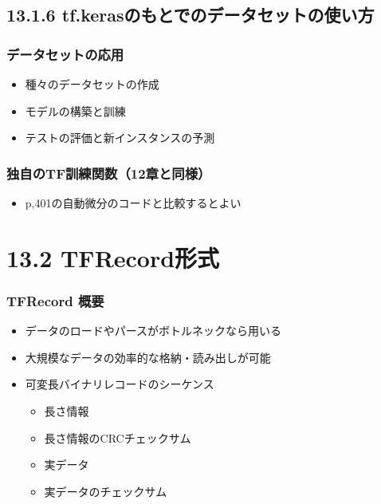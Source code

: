 \hypertarget{tf.kerasux306eux3082ux3068ux3067ux306eux30c7ux30fcux30bfux30bbux30c3ux30c8ux306eux4f7fux3044ux65b9}{%
\subsection{13.1.6
tf.kerasのもとでのデータセットの使い方}\label{tf.kerasux306eux3082ux3068ux3067ux306eux30c7ux30fcux30bfux30bbux30c3ux30c8ux306eux4f7fux3044ux65b9}}

\hypertarget{ux30c7ux30fcux30bfux30bbux30c3ux30c8ux306eux5fdcux7528}{%
\subsubsection{データセットの応用}\label{ux30c7ux30fcux30bfux30bbux30c3ux30c8ux306eux5fdcux7528}}

\begin{itemize}
\tightlist
\item
  種々のデータセットの作成
\item
  モデルの構築と訓練
\item
  テストの評価と新インスタンスの予測
\end{itemize}

\hypertarget{ux72ecux81eaux306etfux8a13ux7df4ux95a2ux657012ux7ae0ux3068ux540cux69d8}{%
\subsubsection{独自のTF訓練関数（12章と同様）}\label{ux72ecux81eaux306etfux8a13ux7df4ux95a2ux657012ux7ae0ux3068ux540cux69d8}}

\begin{itemize}
\tightlist
\item
  p,401の自動微分のコードと比較するとよい
\end{itemize}

\hypertarget{tfrecordux5f62ux5f0f}{%
\section{13.2 TFRecord形式}\label{tfrecordux5f62ux5f0f}}

\hypertarget{tfrecord-ux6982ux8981}{%
\subsubsection{TFRecord 概要}\label{tfrecord-ux6982ux8981}}

\begin{itemize}
\tightlist
\item
  データのロードやパースがボトルネックなら用いる
\item
  大規模なデータの効率的な格納・読み出しが可能
\item
  可変長バイナリレコードのシーケンス

  \begin{itemize}
  \tightlist
  \item
    長さ情報
  \item
    長さ情報のCRCチェックサム
  \item
    実データ
  \item
    実データのチェックサム
  \end{itemize}
\end{itemize}

